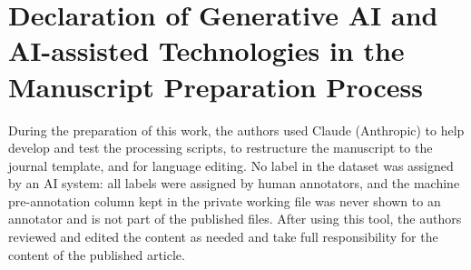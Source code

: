 \section*{Declaration of Generative AI and AI-assisted Technologies in the Manuscript Preparation Process}
During the preparation of this work, the authors used Claude (Anthropic) to help develop and
test the processing scripts, to restructure the manuscript to the journal template, and for
language editing. No label in the dataset was assigned by an AI system: all labels were assigned
by human annotators, and the machine pre-annotation column kept in the private working file was
never shown to an annotator and is not part of the published files. After using this tool, the
authors reviewed and edited the content as needed and take full responsibility for the content
of the published article.
